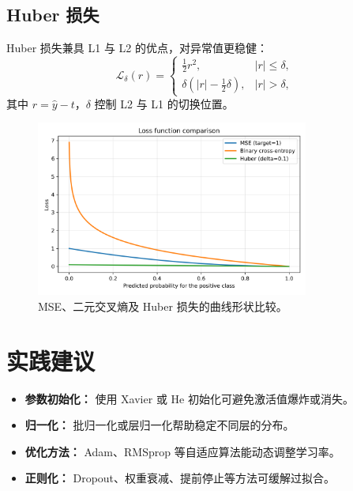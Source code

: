 ﻿\documentclass{ctexart}
\begin{document}
\subsection{Huber 损失}
Huber 损失兼具 L1 与 L2 的优点，对异常值更稳健：
\begin{equation}
  \mathcal{L}_{\delta}(r) = \begin{cases}
    \tfrac{1}{2} r^2, & |r| \le \delta, \\
    \delta(|r| - \tfrac{1}{2}\delta), & |r| > \delta,
  \end{cases}
\end{equation}
其中 $r = \hat{y} - t$，$\delta$ 控制 L2 与 L1 的切换位置。

\begin{figure}[H]
  \centering
  \includegraphics[width=0.8\textwidth]{loss_functions.png}
  \caption{MSE、二元交叉熵及 Huber 损失的曲线形状比较。}
  \label{fig:loss_functions}
\end{figure}
\FloatBarrier

\section{实践建议}
\begin{itemize}
  \item \textbf{参数初始化：} 使用 Xavier 或 He 初始化可避免激活值爆炸或消失。
  \item \textbf{归一化：} 批归一化或层归一化帮助稳定不同层的分布。
  \item \textbf{优化方法：} Adam、RMSprop 等自适应算法能动态调整学习率。
  \item \textbf{正则化：} Dropout、权重衰减、提前停止等方法可缓解过拟合。
\end{itemize}
\end{document}
